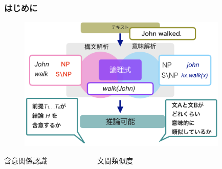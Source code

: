 \documentclass[dvipdfmx]{beamer}
\begin{document}
\begin{frame}
\frametitle{はじめに}
\begin{center}
\begin{figure}[h]
	\includegraphics[width=10cm]{backend1.png}
        \label{fig:backend1}
\end{figure}
\vspace{-1zh}
\begin{center}
含意関係認識　　　　　　　文間類似度\\
\small{\citep{ccg2lambda}}　　\small{\citep{yanaka2017determining}}
\end{center}
\end{center}


\end{frame}


\end{document}
